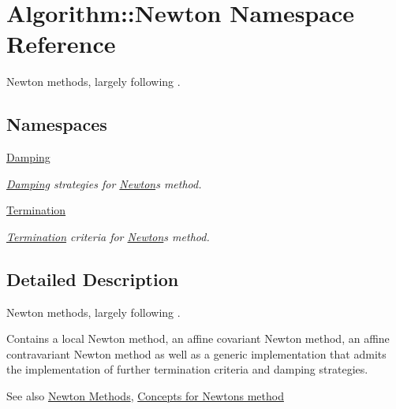 \hypertarget{namespaceAlgorithm_1_1Newton}{}\section{Algorithm\+:\+:Newton Namespace Reference}
\label{namespaceAlgorithm_1_1Newton}


Newton methods, largely following \cite{Deuflhard2004}.  


\subsection*{Namespaces}
\begin{DoxyCompactItemize}
\item 
 \hyperlink{namespaceAlgorithm_1_1Newton_1_1Damping}{Damping}
\begin{DoxyCompactList}\small\item\em \hyperlink{namespaceAlgorithm_1_1Newton_1_1Damping}{Damping} strategies for \hyperlink{namespaceAlgorithm_1_1Newton}{Newton}\textquotesingle{}s method. \end{DoxyCompactList}\item 
 \hyperlink{namespaceAlgorithm_1_1Newton_1_1Termination}{Termination}
\begin{DoxyCompactList}\small\item\em \hyperlink{namespaceAlgorithm_1_1Newton_1_1Termination}{Termination} criteria for \hyperlink{namespaceAlgorithm_1_1Newton}{Newton}\textquotesingle{}s method. \end{DoxyCompactList}\end{DoxyCompactItemize}


\subsection{Detailed Description}
Newton methods, largely following \cite{Deuflhard2004}. 

Contains a local Newton method, an affine covariant Newton method, an affine contravariant Newton method as well as a generic implementation that admits the implementation of further termination criteria and damping strategies. \begin{DoxySeeAlso}{See also}
\hyperlink{group__NewtonGroup}{Newton Methods}, \hyperlink{group__NewtonConceptGroup}{Concepts for Newton\textquotesingle{}s method} 
\end{DoxySeeAlso}
